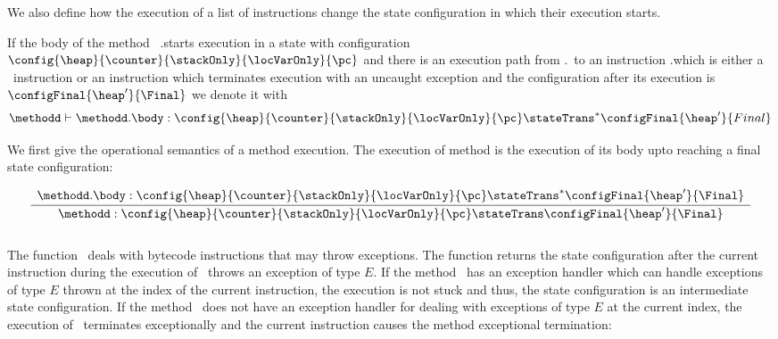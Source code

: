  We also define how the execution of a list of instructions change the state configuration in  which their execution starts.
 
 \begin{transClosStateTrans} \label{stateTransClos}
    If the body of the method \methodd \ \methodd.\body starts execution in a state
    with configuration \\ $\config{ \heap}{\counter}{\stackOnly}{\locVarOnly}{\pc}$ and there is an execution
    path from \method.\entryPoint \ to an instruction \method.\body[k] which is either a \return \ instruction or an 
    instruction which terminates execution with an uncaught exception and the configuration after its execution is 
    $\configFinal{ \heap'}{\Final}$  we denote it with 
    $$ \methodd \vdash \methodd.\body: \config{ \heap}{\counter}{\stackOnly}{\locVarOnly}{ \pc } \stateTrans^{*} \configFinal{ \heap'}{Final} $$
 \end{transClosStateTrans}
 



 We first give the operational semantics of a method execution. The execution of method \methodd 
 is the execution of its body upto reaching a final state configuration:
 
 $$
  \frac{\begin{array}{l}
               \methodd.\body :  
	                    \config{\heap}{\counter}{\stackOnly}{\locVarOnly}{\pc} \stateTrans^{*} \configFinal{\heap'}{\Final}\\
	\end{array}	 
       }
       {\methodd :  \config{\heap}{\counter}{\stackOnly}{\locVarOnly}{\pc} 
		   \stateTrans 
                   \configFinal{\heap'}{\Final} }$$ \\


 
 The function \getStateAfterExc \ deals with bytecode instructions that may throw exceptions. The function returns the state 
 configuration after the current instruction during the execution of \methodd \ throws an exception of type $E$. If the method
 \methodd \ has an  exception handler which can handle  exceptions of type $E$ thrown at the index of the current instruction,
 the execution is not stuck and thus, the state configuration is an intermediate state configuration.
 If the method \methodd \ does not have an exception handler for dealing with exceptions of type $E$ 
 at the current index, the execution of \methodd \ terminates exceptionally and the current instruction
 causes the method exceptional termination:

